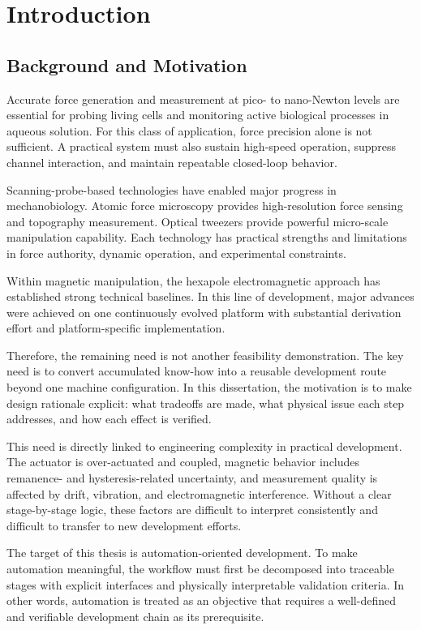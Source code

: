 \chapter{Introduction}

\section{Background and Motivation}

Accurate force generation and measurement at pico- to nano-Newton levels are essential for probing living cells and monitoring active biological processes in aqueous solution. For this class of application, force precision alone is not sufficient. A practical system must also sustain high-speed operation, suppress channel interaction, and maintain repeatable closed-loop behavior.

Scanning-probe-based technologies have enabled major progress in mechanobiology. Atomic force microscopy provides high-resolution force sensing and topography measurement. Optical tweezers provide powerful micro-scale manipulation capability. Each technology has practical strengths and limitations in force authority, dynamic operation, and experimental constraints.

Within magnetic manipulation, the hexapole electromagnetic approach has established strong technical baselines. In this line of development, major advances were achieved on one continuously evolved platform with substantial derivation effort and platform-specific implementation.

Therefore, the remaining need is not another feasibility demonstration. The key need is to convert accumulated know-how into a reusable development route beyond one machine configuration. In this dissertation, the motivation is to make design rationale explicit: what tradeoffs are made, what physical issue each step addresses, and how each effect is verified.

This need is directly linked to engineering complexity in practical development. The actuator is over-actuated and coupled, magnetic behavior includes remanence- and hysteresis-related uncertainty, and measurement quality is affected by drift, vibration, and electromagnetic interference. Without a clear stage-by-stage logic, these factors are difficult to interpret consistently and difficult to transfer to new development efforts.

The target of this thesis is automation-oriented development. To make automation meaningful, the workflow must first be decomposed into traceable stages with explicit interfaces and physically interpretable validation criteria. In other words, automation is treated as an objective that requires a well-defined and verifiable development chain as its prerequisite.


